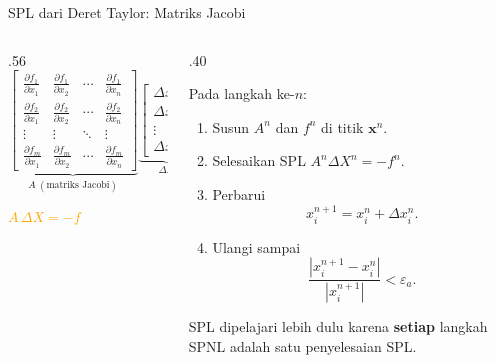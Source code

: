 \documentclass[aspectratio=169,10pt]{beamer}
\newcommand{\highlight}[1]{\textcolor{Orange}{\textbf{#1}}}
\begin{document}
\begin{frame}{SPL dari Deret Taylor: Matriks Jacobi}
\scriptsize
\begin{columns}[T,totalwidth=\textwidth]
\begin{column}{.56\textwidth}
\[
\underbrace{\begin{bmatrix}
\frac{\partial f_1}{\partial x_1} & \frac{\partial f_1}{\partial x_2} & \cdots & \frac{\partial f_1}{\partial x_n}\\[1mm]
\frac{\partial f_2}{\partial x_1} & \frac{\partial f_2}{\partial x_2} & \cdots & \frac{\partial f_2}{\partial x_n}\\[1mm]
\vdots & \vdots & \ddots & \vdots\\[1mm]
\frac{\partial f_m}{\partial x_1} & \frac{\partial f_m}{\partial x_2} & \cdots & \frac{\partial f_m}{\partial x_n}
\end{bmatrix}}_{A\ (\text{matriks Jacobi})}
\underbrace{\begin{bmatrix}\Delta x_1\\ \Delta x_2\\ \vdots\\ \Delta x_n\end{bmatrix}}_{\Delta X}
=
\underbrace{\begin{bmatrix}-f_1\\ -f_2\\ \vdots\\ -f_m\end{bmatrix}}_{-f}
\]
\begin{center}
\highlight{$A\,\Delta X=-f$}
\end{center}
\end{column}
\begin{column}{.40\textwidth}
\begin{bluebox}
Pada langkah ke-$n$:
\begin{enumerate}\setlength\itemsep{2pt}
\item Susun $A^n$ dan $f^n$ di titik $\mathbf{x}^n$.
\item Selesaikan SPL $A^n\Delta X^n=-f^n$.
\item Perbarui
\[
x_i^{n+1}=x_i^n+\Delta x_i^n.
\]
\item Ulangi sampai
\[
\frac{|x_i^{n+1}-x_i^{n}|}{|x_i^{n+1}|}<\varepsilon_a .
\]
\end{enumerate}
\end{bluebox}
\begin{goldbox}
SPL dipelajari lebih dulu karena \textbf{setiap} langkah SPNL adalah satu penyelesaian SPL.
\end{goldbox}
\end{column}
\end{columns}
\end{frame}
\end{document}
